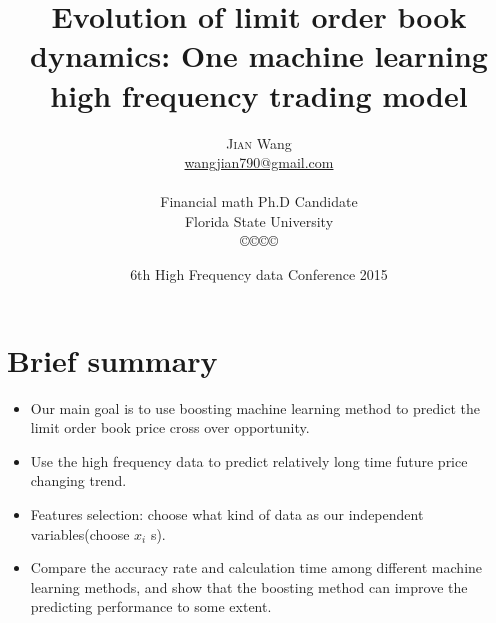 \documentclass[xcolor={x11names,svgnames,dvipsnames}]{beamer}
\author[\textsc{Jian} Wang]{\textsc{Jian} Wang\\[1ex]%
{\small\url{wangjian790@gmail.com}\\[-.5ex]\url{}}\\
{\small{Financial math Ph.D Candidate}}\\
{\small{Florida State University}}\\
[0.8ex]\copyright\copyright\copyright\copyright} %
\title{Evolution of limit order book dynamics: One machine learning high frequency trading model}
\date[\textsc{HFC} 2015]{6th High Frequency data Conference 2015 }%
\begin{document}
\begin{frame}
\maketitle
\end{frame}



\section{Brief summary}
\begin{frame}
\begin{itemize}
	\item Our main goal is to use boosting machine learning method to predict the limit order book price \alert{cross over} opportunity.  	
	\item Use the high frequency data to predict relatively \alert{long time} future price changing trend.
     \item Features selection: choose what kind of data as our independent variables(\alert{choose $x_i$ s}).  
   	\item Compare the accuracy rate and calculation time  among different machine learning methods, and show that the boosting method can improve the \alert{predicting performance} to some extent.  	
\end{itemize}
\end{frame}
\end{document}
